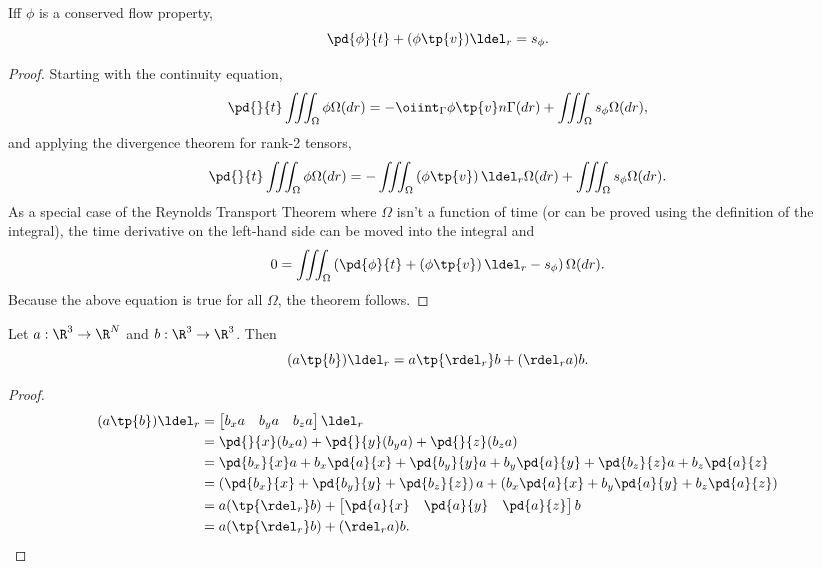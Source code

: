 \begin{thm}
Iff $\phi$ is a conserved flow property,
\begin{equation}
    \label{continuity0}
    \pd{\phi}{t} + ( \phi \tp{v} ) \ldel_r = s_\phi.
\end{equation}
\end{thm}

\begin{proof}
    Starting with the continuity equation,
    \begin{equation}
        \pd{}{t} \iiint_\Omega \phi \Omega(dr) =
        -\oiint_\Gamma \phi \tp{v} n \Gamma(dr)
        + \iiint_\Omega s_\phi \Omega(dr),
    \end{equation}
    and applying the divergence theorem for rank-2 tensors,
    \begin{equation}
        \pd{}{t} \iiint_\Omega \phi \Omega(dr) =
        -\iiint_\Omega \left(\phi \tp{v} \right) \ldel_r \Omega(dr)
        + \iiint_\Omega s_\phi \Omega(dr).
    \end{equation}
    As a special case of the Reynolds Transport Theorem where $\Omega$ isn't
    a function of time (or can be proved using the definition of the integral),
    the time derivative on the left-hand side can be moved into the integral and
    \begin{equation}
        0 = \iiint_\Omega \left( \pd{\phi}{t} +
        \left(\phi \tp{v} \right) \ldel_r
        - s_\phi \right) \Omega(dr).
    \end{equation}
    Because the above equation is true for all $\Omega$, the theorem follows.
\end{proof}

\begin{lem}
Let $a:\R^3\to \R^N$ and $b:\R^3\to \R^3$.  Then
\begin{equation}
    \label{lem:nablaab}
    (a\tp{b})\ldel_r = a \tp{\rdel_r} b  + (\rdel_r a) b.
\end{equation}
\end{lem}
\begin{proof}
    \begin{align}
        (a\tp{b})\ldel_r &= \begin{bmatrix}
            b_x a & b_y a & b_z a
        \end{bmatrix} \ldel_r \\
        &= \pd{}{x} (b_x a) + \pd{}{y} (b_y a) + \pd{}{z} (b_z a) \\
        &= \pd{b_x}{x} a + b_x \pd{a}{x} +
           \pd{b_y}{y} a + b_y \pd{a}{y} +
           \pd{b_z}{z} a + b_z \pd{a}{z} \\
        &= \left( \pd{b_x}{x} + \pd{b_y}{y} + \pd{b_z}{z} \right)a +
           \left(b_x \pd{a}{x} + b_y \pd{a}{y} + b_z \pd{a}{z} \right) \\
        &= a ( \tp{\rdel_r} b ) + \begin{bmatrix}
            \pd{a}{x} & \pd{a}{y} & \pd{a}{z}
        \end{bmatrix} b \\
        &= a (\tp{\rdel_r} b) + (\rdel_r a) b.
    \end{align}
\end{proof}

